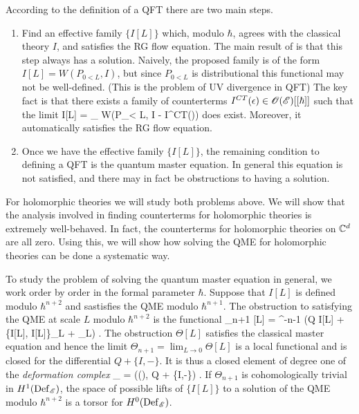 \documentclass[10pt]{amsart}
\begin{document}
According to the definition of a QFT there are two main steps. 

\begin{enumerate}
\item Find an effective family $\{I[L]\}$ which, modulo $\hbar$, agrees with the classical theory $I$, and satisfies the RG flow equation. 
The main result of \cite{CostelloRenormalization} is that this step always has a solution. 
Naively, the proposed family is of the form $I[L] = W(P_{0<L}, I)$, but since $P_{0<L}$ is distributional this functional may not be well-defined. (This is the problem of UV divergence in QFT)
The key fact is that there exists a family of counterterms $I^{CT}(\epsilon) \in \mathscr O(\mathscr E)[[\hbar]]$ such that the limit
\ben
I[L] = \lim_{\epsilon {}} W(P_{\epsilon < L}, I - I^{CT}(\epsilon))
\een
does exist.
Moreover, it automatically satisfies the RG flow equation.
\item Once we have the effective family $\{I[L]\}$, the remaining condition to defining a QFT is the quantum master equation.
In general this equation is not satisfied, and there may in fact be obstructions to having a solution.
\end{enumerate}

For holomorphic theories we will study both problems above.
We will show that the analysis involved in finding counterterms for holomorphic theories is extremely well-behaved. 
In fact, the counterterms for holomorphic theories on $\mathbb C^d$ are all zero.
Using this, we will show how solving the QME for holomorphic theories can be done a systematic way.

To study the problem of solving the quantum master equation in general, we work order by order in the formal parameter $\hbar$.
Suppose that $I[L]$ is defined modulo $\hbar^{n+2}$ and sastisfies the QME modulo $\hbar^{n+1}$.
The obstruction to satisfying the QME at scale $L$ modulo $\hbar^{n+2}$ is the functional
\ben
\Theta_{n+1} [L] = \hbar^{-n-1} (Q I[L] + \{I[L], I[L]\}_L + \hbar \Delta_L) .
\een
The obstruction $\Theta[L]$ satisfies the classical master equation and hence the limit $\Theta_{n+1} = \lim_{L \to 0} \Theta[L]$ is a local functional and is closed for the differential $Q + \{I, -\}$. 
It is thus a closed element of degree one of the {\em deformation complex}
\ben
\Def_{\sE} = \left(\oloc(\sE), Q + \{I,-\}\right) .
\een
If $\Theta_{n+1}$ is cohomologically trivial in $H^1({\rm Def}_{\mathscr E})$, the space of possible lifts of $\{I[L]\}$ to a solution of the QME modulo $\hbar^{n+2}$ is a torsor for $H^0({\rm Def}_{\mathscr E})$. 
\end{document}
